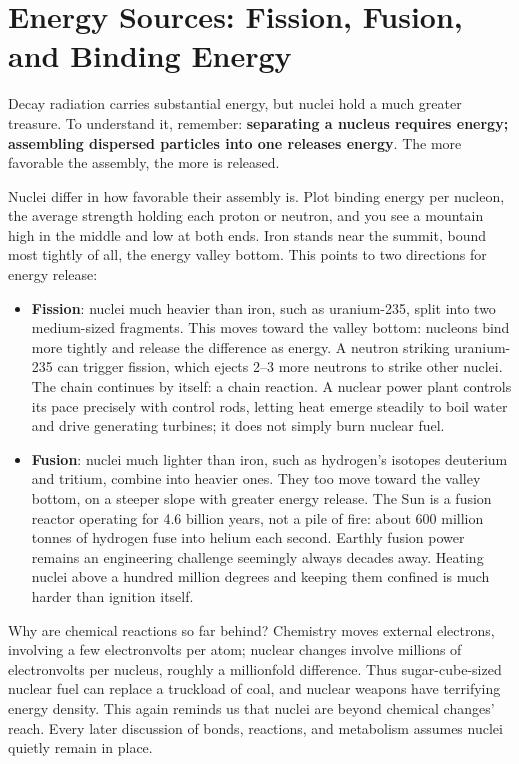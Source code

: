 \section{Energy Sources: Fission, Fusion, and Binding Energy}

Decay radiation carries substantial energy, but nuclei hold a much greater treasure. To understand it, remember: \textbf{separating a nucleus requires energy; assembling dispersed particles into one releases energy}. The more favorable the assembly, the more is released.

Nuclei differ in how favorable their assembly is. Plot binding energy per nucleon, the average strength holding each proton or neutron, and you see a mountain high in the middle and low at both ends. Iron stands near the summit, bound most tightly of all, the energy valley bottom. This points to two directions for energy release:

\begin{itemize}[itemsep=2pt]
\item \textbf{Fission}: nuclei much heavier than iron, such as uranium-235, split into two medium-sized fragments. This moves toward the valley bottom: nucleons bind more tightly and release the difference as energy. A neutron striking uranium-235 can trigger fission, which ejects 2--3 more neutrons to strike other nuclei. The chain continues by itself: a chain reaction. A nuclear power plant controls its pace precisely with control rods, letting heat emerge steadily to boil water and drive generating turbines; it does not simply burn nuclear fuel.
\item \textbf{Fusion}: nuclei much lighter than iron, such as hydrogen's isotopes deuterium and tritium, combine into heavier ones. They too move toward the valley bottom, on a steeper slope with greater energy release. The Sun is a fusion reactor operating for 4.6 billion years, not a pile of fire: about 600 million tonnes of hydrogen fuse into helium each second. Earthly fusion power remains an engineering challenge seemingly always decades away. Heating nuclei above a hundred million degrees and keeping them confined is much harder than ignition itself.
\end{itemize}

Why are chemical reactions so far behind? Chemistry moves external electrons, involving a few electronvolts per atom; nuclear changes involve millions of electronvolts per nucleus, roughly a millionfold difference. Thus sugar-cube-sized nuclear fuel can replace a truckload of coal, and nuclear weapons have terrifying energy density. This again reminds us that nuclei are beyond chemical changes' reach. Every later discussion of bonds, reactions, and metabolism assumes nuclei quietly remain in place.

